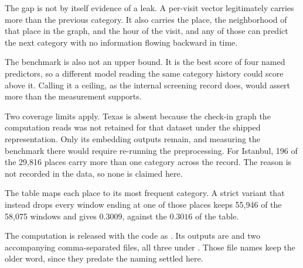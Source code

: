 The gap is not by itself evidence of a leak. A per-visit vector legitimately carries more than the
previous category. It also carries the place, the neighborhood of that place in the graph, and the
hour of the visit, and any of those can predict the next category with no information flowing
backward in time.

The benchmark is also not an upper bound. It is the best score of four named predictors, so a
different model reading the same category history could score above it. Calling it a ceiling, as
the internal screening record does, would assert more than the measurement supports.

Two coverage limits apply. Texas is absent because the check-in graph the computation reads was not
retained for that dataset under the shipped representation. Only its embedding outputs remain, and
measuring the benchmark there would require re-running the preprocessing. For Istanbul, 196 of the 29,816 places carry more than one category across the
record. The reason is not recorded in the data, so none is claimed here.

The table maps each place to its most frequent category. A strict variant
that instead drops every window ending at one of those places keeps 55,946 of the 58,075 windows
and gives $0.3009$, against the $0.3016$ of the table.

The computation is released with the code as
. Its outputs are
 and two accompanying comma-separated files, all three under
. Those file names keep the older word, since they
predate the naming settled here.
